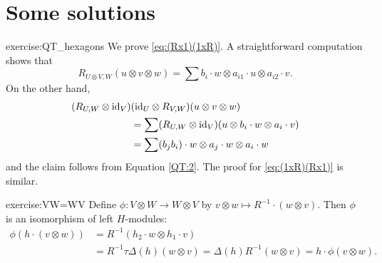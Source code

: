 \section{Some solutions}


\begin{sol}{exercise:QT_hexagons}
We prove \eqref{eq:(Rx1)(1xR)}. A straightforward computation shows
that 
\[
R_{U\otimes V,W}(u\otimes v\otimes w)=\sum b_{i}\cdot w\otimes a_{i1}\cdot u\otimes a_{i2}\cdot v.
\]
On the other hand,
\begin{align*}
(R_{U,W}\otimes\mathrm{id}_{V}) & (\mathrm{id}_{U}\otimes R_{V,W})(u\otimes v\otimes w)\\
 & =\sum(R_{U,W}\otimes\mathrm{id}_{V})(u\otimes b_{i}\cdot w\otimes a_{i}\cdot v)\\
 & =\sum(b_{j}b_{i})\cdot w\otimes a_{j}\cdot w\otimes a_{i}\cdot w
\end{align*}
and the claim follows from Equation \eqref{QT:2}. The proof for \eqref{eq:(1xR)(Rx1)}
is similar. 
\end{sol}

\begin{sol}{exercise:VW=WV}
Define $\phi:V\otimes W\to W\otimes V$ by $v\otimes w\mapsto R^{-1}\cdot (w\otimes
v)$. Then $\phi$ is an isomorphism of left $H$-modules:
\begin{align*}
\phi(h\cdot (v\otimes w))&=R^{-1}(h_2\cdot w\otimes h_1\cdot v)\\
&=R^{-1}\tau\Delta(h)(w\otimes v)=\Delta(h)R^{-1}(w\otimes v)=h\cdot \phi(v\otimes w).
\end{align*}
\end{sol}


